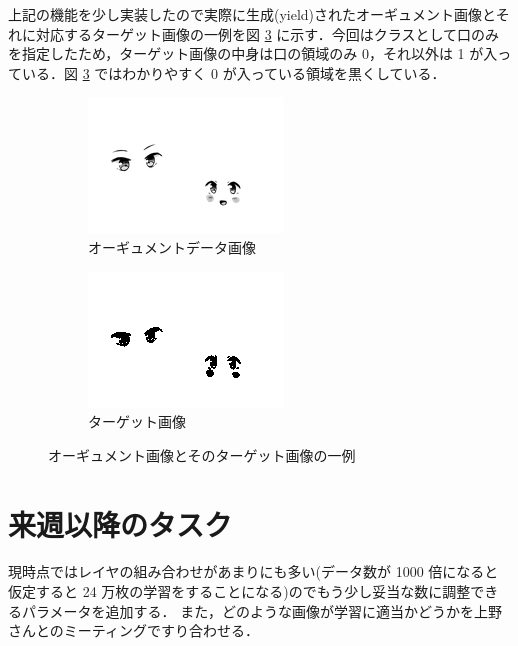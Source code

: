 \documentclass[onecolumn]{ujarticle}     %
\begin{document}
	上記の機能を少し実装したので実際に生成(yield)されたオーギュメント画像とそれに対応するターゲット画像の一例を図 \ref{fig:data_and_target} に示す．今回はクラスとして口のみを指定したため，ターゲット画像の中身は口の領域のみ 0，それ以外は 1 が入っている．図 \ref{fig:data_and_target} ではわかりやすく 0 が入っている領域を黒くしている． 
	\begin{figure}[h]
		\vspace{-4mm}
		\centering
		\begin{subfigure}{0.49\columnwidth}
			\centering
			\includegraphics[width=1.2\columnwidth]{data.png}
			\caption{オーギュメントデータ画像}
			\label{fig:data}
		\end{subfigure}
		\begin{subfigure}{0.49\columnwidth}
			\centering
			\includegraphics[width=1.2\columnwidth]{target.png}
			\caption{ターゲット画像}
			\label{fig:target}
		\end{subfigure}
		\caption{オーギュメント画像とそのターゲット画像の一例}
		\label{fig:data_and_target}
	\end{figure}

	\section{来週以降のタスク}
	現時点ではレイヤの組み合わせがあまりにも多い(データ数が 1000 倍になると仮定すると 24 万枚の学習をすることになる)のでもう少し妥当な数に調整できるパラメータを追加する．
	また，どのような画像が学習に適当かどうかを上野さんとのミーティングですり合わせる．
\end{document}
